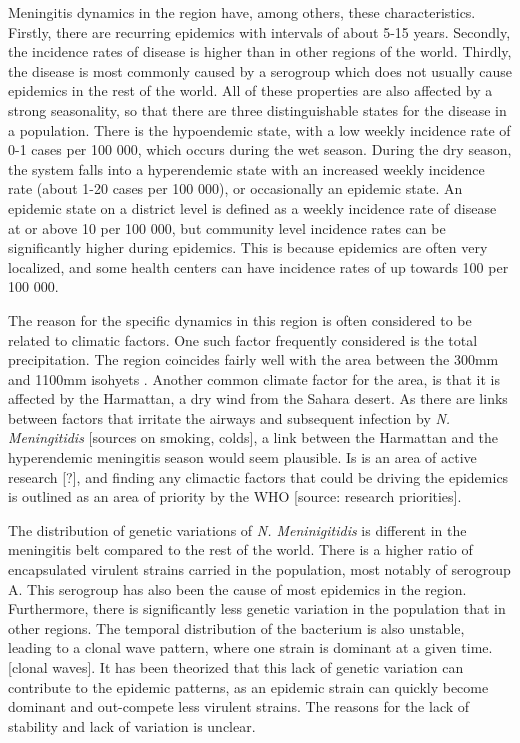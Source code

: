 \documentclass[10pt,a4paper]{article}
\begin{document}
Meningitis dynamics in the region have, among others, these characteristics. Firstly, there are recurring epidemics with intervals of about 5-15 years. Secondly, the incidence rates of disease is higher than in other regions of the world. Thirdly, the disease is most commonly caused by a serogroup which does not usually cause epidemics in the rest of the world. All of these properties are also affected by a strong seasonality, so that there are three distinguishable states for the disease in a population. There is the hypoendemic state, with a low weekly incidence rate of 0-1 cases per 100 000, which occurs during the wet season. During the dry season, the system falls into a hyperendemic state with an increased weekly incidence rate (about 1-20 cases per 100 000), or occasionally an epidemic state. An epidemic state on a district level is defined as a weekly incidence rate of disease at or above 10 per 100 000, but community level incidence rates can be significantly higher during epidemics. This is because epidemics are often very localized, and some health centers can have incidence rates of up towards 100 per 100 000.  \cite{mueller2010hypothetical}

The reason for the specific dynamics in this region is often considered to be related to climatic factors. One such factor frequently considered is the total precipitation. The region coincides fairly well with the area between the 300mm and 1100mm isohyets \cite{molesworth2002meningitis}. Another common climate factor for the area, is that it is affected by the Harmattan, a dry wind from the Sahara desert. As there are links between factors that irritate the airways and subsequent infection by \emph{N. Meningitidis} [sources on smoking, colds], a link between the Harmattan and the hyperendemic meningitis season would seem plausible. Is is an area of active research [?], and finding any climactic factors that could be driving the epidemics is outlined as an area of priority by the WHO [source: research priorities].

The distribution of genetic variations of \emph{N. Meninigitidis} is different in the meningitis belt compared to the rest of the world. There is a higher ratio of encapsulated virulent strains carried in the population, most notably of serogroup A. This serogroup has also been the cause of most epidemics in the region. Furthermore, there is significantly less genetic variation in the population that in other regions. The temporal distribution of the bacterium is also unstable, leading to a clonal wave pattern, where one strain is dominant at a given time. [clonal waves]. It has been theorized that this lack of genetic variation can contribute to the epidemic patterns, as an epidemic strain can quickly become dominant and out-compete less virulent strains. The reasons for the lack of stability and lack of variation is unclear.
\end{document}
